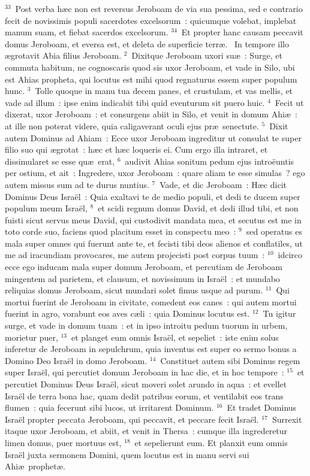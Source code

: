 ${}^{33}$~Post verba h\ae c non est reversus Jeroboam de via sua pessima, sed e contrario fecit de novissimis populi sacerdotes excelsorum~: quicumque volebat, implebat manum suam, et fiebat sacerdos excelsorum.
${}^{34}$~Et propter hanc causam peccavit domus Jeroboam, et eversa est, et deleta de superficie terr\ae .
~\lettrine[lines=10,image=true,loversize=0.05,lraise=-0.03]{I}{}n tempore illo \ae grotavit Abia filius Jeroboam.
${}^{2}$~Dixitque Jeroboam uxori su\ae~: Surge, et commuta habitum, ne cognoscaris quod sis uxor Jeroboam, et vade in Silo, ubi est Ahias propheta, qui locutus est mihi quod regnaturus essem super populum hunc.
${}^{3}$~Tolle quoque in manu tua decem panes, et crustulam, et vas mellis, et vade ad illum~: ipse enim indicabit tibi quid eventurum sit puero huic.
${}^{4}$~Fecit ut dixerat, uxor Jeroboam~: et consurgens abiit in Silo, et venit in domum Ahi\ae~: at ille non poterat videre, quia caligaverant oculi ejus pr\ae\ senectute.
${}^{5}$~Dixit autem Dominus ad Ahiam~: Ecce uxor Jeroboam ingreditur ut consulat te super filio suo qui \ae grotat~: h\ae c et h\ae c loqueris ei. Cum ergo illa intraret, et dissimularet se esse qu\ae\ erat,
${}^{6}$~audivit Ahias sonitum pedum ejus intro\"euntis per ostium, et ait~: Ingredere, uxor Jeroboam~: quare aliam te esse simulas~? ego autem missus sum ad te durus nuntius.
${}^{7}$~Vade, et dic Jeroboam~: H\ae c dicit Dominus Deus Isra\"el~: Quia exaltavi te de medio populi, et dedi te ducem super populum meum Isra\"el,
${}^{8}$~et scidi regnum domus David, et dedi illud tibi, et non fuisti sicut servus meus David, qui custodivit mandata mea, et secutus est me in toto corde suo, faciens quod placitum esset in conspectu meo~:
${}^{9}$~sed operatus es mala super omnes qui fuerunt ante te, et fecisti tibi deos alienos et conflatiles, ut me ad iracundiam provocares, me autem projecisti post corpus tuum~:
${}^{10}$~idcirco ecce ego inducam mala super domum Jeroboam, et percutiam de Jeroboam mingentem ad parietem, et clausum, et novissimum in Isra\"el~: et mundabo reliquias domus Jeroboam, sicut mundari solet fimus usque ad purum.
${}^{11}$~Qui mortui fuerint de Jeroboam in civitate, comedent eos canes~: qui autem mortui fuerint in agro, vorabunt eos aves c\ae li~: quia Dominus locutus est.
${}^{12}$~Tu igitur surge, et vade in domum tuam~: et in ipso introitu pedum tuorum in urbem, morietur puer,
${}^{13}$~et planget eum omnis Isra\"el, et sepeliet~: iste enim solus inferetur de Jeroboam in sepulchrum, quia inventus est super eo sermo bonus a Domino Deo Isra\"el in domo Jeroboam.
${}^{14}$~Constituet autem sibi Dominus regem super Isra\"el, qui percutiet domum Jeroboam in hac die, et in hoc tempore~:
${}^{15}$~et percutiet Dominus Deus Isra\"el, sicut moveri solet arundo in aqua~: et evellet Isra\"el de terra bona hac, quam dedit patribus eorum, et ventilabit eos trans flumen~: quia fecerunt sibi lucos, ut irritarent Dominum.
${}^{16}$~Et tradet Dominus Isra\"el propter peccata Jeroboam, qui peccavit, et peccare fecit Isra\"el.
${}^{17}$~Surrexit itaque uxor Jeroboam, et abiit, et venit in Thersa~: cumque illa ingrederetur limen domus, puer mortuus est,
${}^{18}$~et sepelierunt eum. Et planxit eum omnis Isra\"el juxta sermonem Domini, quem locutus est in manu servi sui Ahi\ae\ prophet\ae .



